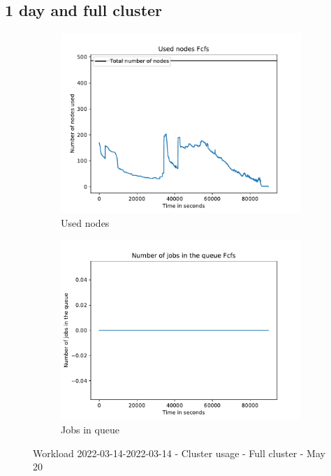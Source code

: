 \documentclass[a4paper]{article}
\begin{document}
	\subsection{1 day and full cluster}
	\begin{figure}[H]\centering
	\begin{subfigure}[b]{0.4\linewidth}\centering\includegraphics[width=1\linewidth]{MBSS/plot/2022-03-14->2022-03-14_Fcfs_Used_nodes_450_128_32_256_4_1024.pdf}\caption{Used nodes}\end{subfigure}
	\begin{subfigure}[b]{0.4\linewidth}\centering\includegraphics[width=1\linewidth]{MBSS/plot/2022-03-14->2022-03-14_Fcfs_Nb_scheduled_jobs_450_128_32_256_4_1024.pdf}\caption{Jobs in queue}\end{subfigure}
	\caption{Workload 2022-03-14-2022-03-14 - Cluster usage - Full cluster - May 20}\end{figure}
	
\end{document}
